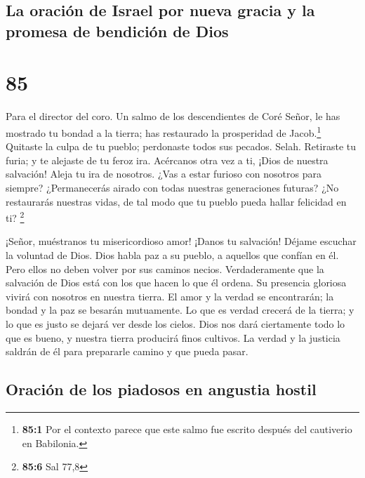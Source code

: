 \hypertarget{la-oraciuxf3n-de-israel-por-nueva-gracia-y-la-promesa-de-bendiciuxf3n-de-dios}{%
\subsection{La oración de Israel por nueva gracia y la promesa de
bendición de
Dios}\label{la-oraciuxf3n-de-israel-por-nueva-gracia-y-la-promesa-de-bendiciuxf3n-de-dios}}

\hypertarget{section-84}{%
\section{85}\label{section-84}}

Para el director del coro. Un salmo de los descendientes de Coré
 Señor, le has mostrado tu bondad a la tierra; has
restaurado la prosperidad de Jacob.\footnote{\textbf{85:1} Por el
  contexto parece que este salmo fue escrito después del cautiverio en
  Babilonia.}  Quitaste la culpa de tu pueblo; perdonaste
todos sus pecados. Selah.  Retiraste tu furia; y te
alejaste de tu feroz ira.  Acércanos otra vez a ti, ¡Dios
de nuestra salvación! Aleja tu ira de nosotros.  ¿Vas a
estar furioso con nosotros para siempre? ¿Permanecerás airado con todas
nuestras generaciones futuras?  ¿No restaurarás nuestras
vidas, de tal modo que tu pueblo pueda hallar felicidad en ti?
\footnote{\textbf{85:6} Sal 77,8}

 ¡Señor, muéstranos tu misericordioso amor! ¡Danos tu
salvación!  Déjame escuchar la voluntad de Dios. Dios
habla paz a su pueblo, a aquellos que confían en él. Pero ellos no deben
volver por sus caminos necios.  Verdaderamente que la
salvación de Dios está con los que hacen lo que él ordena. Su presencia
gloriosa vivirá con nosotros en nuestra tierra.  El amor
y la verdad se encontrarán; la bondad y la paz se besarán mutuamente.
 Lo que es verdad crecerá de la tierra; y lo que es justo
se dejará ver desde los cielos.  Dios nos dará
ciertamente todo lo que es bueno, y nuestra tierra producirá finos
cultivos.  La verdad y la justicia saldrán de él para
prepararle camino y que pueda pasar.

\hypertarget{oraciuxf3n-de-los-piadosos-en-angustia-hostil}{%
\subsection{Oración de los piadosos en angustia
hostil}\label{oraciuxf3n-de-los-piadosos-en-angustia-hostil}}

